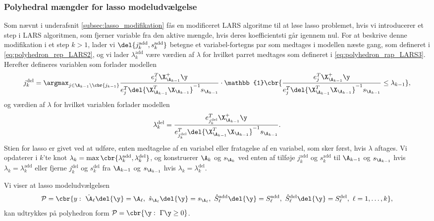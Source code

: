\subsubsection{Polyhedral mængder for lasso modeludvælgelse}
Som nævnt i underafsnit \ref{subsec:lasso_modifikation} fås en modificeret LARS algoritme til at løse lasso problemet, hvis vi introducerer et step i LARS algoritmen, som fjerner variable fra den aktive mængde, hvis deres koefficientsti går igennem nul.
For at beskrive denne modifikation i et step \(k>1\), lader vi \(\del{j_k^\text{add}, s_k^\text{add}}\) betegne et variabel-fortegns par som medtages i modellen næste gang, som defineret i \eqref{eq:polyhedron_rep_LARS2}, og vi lader \(\lambda_k^\text{add}\) være værdien af \(\lambda\) for hvilket parret medtages som defineret i \eqref{eq:polyhedron_rap_LARS3}.
Herefter defineres variablen som forlader modellen
\begin{align}
j_k^\text{del} = \argmax_{j \in \A_{k-1} \backslash \cbr{j_{k-1}}} \frac{e_j^T \X_{\A_{k-1}}^+ \y}{e_j^T \del{\X_{\A_{k-1}}^T \X_{\A_{k-1}}}^{-1} s_{\A_{k-1}}} \cdot \mathbb{1} \cbr{\frac{e_j^T \X_{\A_{k-1}}^+ \y}{e_j^T \del{\X_{\A_{k-1}}^T \X_{\A_{k-1}}}^{-1} s_{\A_{k-1}}} \leq \lambda_{k-1}}, \label{eq:post_29}
\end{align}
og værdien af \(\lambda\) for hvilket variablen forlader modellen
\begin{align*}
\lambda_k^\text{del} = \frac{e_{j_k^\text{del}}^T \X_{\A_{k-1}}^+ \y}{e_{j_k^\text{del}}^T \del{\X_{\A_{k-1}}^T \X_{\A_{k-1}}}^{-1} s_{\A_{k-1}}}.
\end{align*}
Stien for lasso er givet ved at udføre, enten medtagelse af en variabel eller fratagelse af en variabel, som sker først, hvis \(\lambda\) aftages.
Vi opdaterer i \(k\)'te knot \(\lambda_k = \max \cbr{\lambda_k^\text{add},\lambda_k^\text{del}}\), og konstruerer \(\A_k\) og \(s_{\A_k}\) ved enten af tilføje \(j_k^\text{add}\) og \(s_k^\text{add}\) til \(\A_{k-1}\) og \(s_{\A_{k-1}}\) hvis \(\lambda_k = \lambda_k^\text{add}\) eller fjerne \(j_k^\text{del}\) og \(s_k^\text{del}\) fra \(\A_{k-1}\) og \(s_{\A_{k-1}}\)  hvis \(\lambda_k = \lambda_k^\text{del}\).

Vi viser at lasso modeludvælgelsen
\begin{align}
\mathcal{P} = \cbr{y: \ \hat{\A}_\ell \del{\y} = \A_\ell, \ \hat{s}_{\A_\ell} \del{\y} = s_{\A_\ell}, \ \hat{S}^\text{add}_\ell \del{\y} = S^\text{add}_\ell, \ \hat{S}^\text{del}_\ell \del{\y} = S^\text{del}_\ell, \ \ell = 1, \ldots, k}, \label{eq:post_31}
\end{align}
kan udtrykkes på polyhedron form \(\mathcal{P} = \cbr{\y : \ \Gamma \y \geq 0}\).

